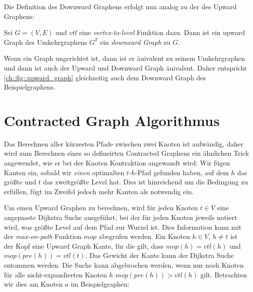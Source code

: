Die Definition des Downward Graphens erfolgt nun analog zu der des Upward Graphens:

\begin{definition}
    Sei $G = (V, E)$ und ${vtl}$ eine \emph{vertex-to-level} Funktion dazu. Dann ist ein upward Graph des Umkehrgraphens $G^T$ ein \emph{downward Graph} zu $G$.
\end{definition}

Wenn ein Graph ungerichtet ist, dann ist er äuivalent zu seinem Umkehrgraphen und dann ist auch der Upward und Downward Graph äuivalent.
Daher entspricht \autoref{ch::fig::upward_graph} gleichzeitig auch dem Downward Graph des Beispielgraphens.


\section{Contracted Graph Algorithmus}

Das Berechnen aller kürzesten Pfade zwischen zwei Knoten ist aufwändig, daher wird zum Berechnen eines so defineirten Contracted Graphens ein ähnlichen Trick angewendet, wie er bei der Knoten Kontraktion angewandt wird:
Wir fügen Kanten ein, sobald wir \emph{einen} optimalten $t$-$h$-Pfad gefunden haben, auf dem $h$ das größte und $t$ das zweitgrößte Level hat.
Dies ist hinreichend um die Bedingung zu erfüllen, fügt im Zweifel jedoch mehr Kanten als notwendig ein.

Um einen Upward Graphen zu berechnen, wird für jeden Knoten $t \in V$ eine angepasste Dijkstra Suche ausgeführt, bei der für jeden Knoten jeweils notiert wird, was größte Level auf dem Pfad zur Wurzel ist.
Dies Information kann mit der \emph{max-on-path} Funktion ${mop}$ abegrufen werden.
Ein Knoten $h \in V$, $h \neq t$ ist der Kopf eine Upward Graph Kante, für die gilt, dass ${mop}(h) = {vtl}(h)$ und ${mop}({pre}(h)) = {vtl}(t)$.
Das Gewicht der Kante kann der Dijkstra Suche entommen werden.
Die Suche kann abgebrochen werden, wenn nur noch Knoten für alle nicht-expandierten Knoten $h$ ${mop}({pre}(h)) > {vtl}(h)$ gilt.
Betrachten wir dies am Knoten $a$ im Beispielgraphen:

